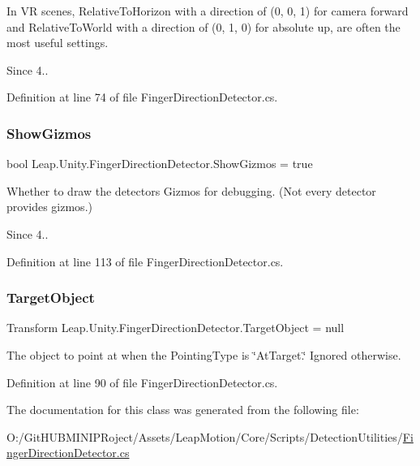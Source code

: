 In VR scenes, Relative\+To\+Horizon with a direction of (0, 0, 1) for camera forward and Relative\+To\+World with a direction of (0, 1, 0) for absolute up, are often the most useful settings. \begin{DoxySince}{Since}
4.. 
\end{DoxySince}


Definition at line 74 of file Finger\+Direction\+Detector.\+cs.

\mbox{\label{class_leap_1_1_unity_1_1_finger_direction_detector_a9bbe98671cb2301bb9f6b4eee2e115e7}} 
\subsubsection{\texorpdfstring{ShowGizmos}{ShowGizmos}}
{\footnotesize\ttfamily bool Leap.\+Unity.\+Finger\+Direction\+Detector.\+Show\+Gizmos = true}

Whether to draw the detector\textquotesingle{}s Gizmos for debugging. (Not every detector provides gizmos.) \begin{DoxySince}{Since}
4.. 
\end{DoxySince}


Definition at line 113 of file Finger\+Direction\+Detector.\+cs.

\mbox{\label{class_leap_1_1_unity_1_1_finger_direction_detector_a2f90f8d78d0447b6129b6a43c7ecee09}} 
\subsubsection{\texorpdfstring{TargetObject}{TargetObject}}
{\footnotesize\ttfamily Transform Leap.\+Unity.\+Finger\+Direction\+Detector.\+Target\+Object = null}

The object to point at when the Pointing\+Type is \char`\"{}\+At\+Target.\char`\"{} Ignored otherwise. 

Definition at line 90 of file Finger\+Direction\+Detector.\+cs.



The documentation for this class was generated from the following file\+:\begin{DoxyCompactItemize}
\item 
O\+:/\+Git\+H\+U\+B\+M\+I\+N\+I\+P\+Roject/\+Assets/\+Leap\+Motion/\+Core/\+Scripts/\+Detection\+Utilities/\mbox{\hyperlink{_finger_direction_detector_8cs}{Finger\+Direction\+Detector.\+cs}}\end{DoxyCompactItemize}
